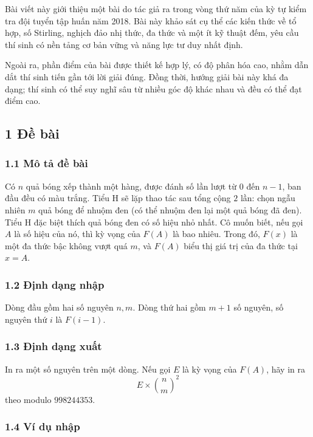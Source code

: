 \documentclass[11pt]{article}
\begin{document}
Bài viết này giới thiệu một bài do tác giả ra trong vòng thứ năm của kỳ tự kiểm
tra đội tuyển tập huấn năm 2018. Bài này khảo sát cụ thể các kiến thức về tổ
hợp, số Stirling, nghịch đảo nhị thức, đa thức và một ít kỹ thuật đếm, yêu cầu
thí sinh có nền tảng cơ bản vững và năng lực tư duy nhất định.

Ngoài ra, phần điểm của bài được thiết kế hợp lý, có độ phân hóa cao, nhằm dẫn
dắt thí sinh tiến gần tới lời giải đúng. Đồng thời, hướng giải bài này khá đa
dạng; thí sinh có thể suy nghĩ sâu từ nhiều góc độ khác nhau và đều có thể đạt
điểm cao.

\subsection*{1 Đề bài}

\subsubsection*{1.1 Mô tả đề bài}

Có \(n\) quả bóng xếp thành một hàng, được đánh số lần lượt từ \(0\) đến
\(n-1\), ban đầu đều có màu trắng. Tiểu H sẽ lặp thao tác sau tổng cộng
\(2\) lần: chọn ngẫu nhiên \(m\) quả bóng để nhuộm đen (có thể nhuộm đen lại
một quả bóng đã đen). Tiểu H đặc biệt thích quả bóng đen có số hiệu nhỏ nhất.
Cô muốn biết, nếu gọi \(A\) là số hiệu của nó, thì kỳ vọng của \(F(A)\) là bao
nhiêu. Trong đó, \(F(x)\) là một đa thức bậc không vượt quá \(m\), và \(F(A)\)
biểu thị giá trị của đa thức tại \(x=A\).

\subsubsection*{1.2 Định dạng nhập}

Dòng đầu gồm hai số nguyên \(n,m\). Dòng thứ hai gồm \(m+1\) số nguyên, số
nguyên thứ \(i\) là \(F(i-1)\).

\subsubsection*{1.3 Định dạng xuất}

In ra một số nguyên trên một dòng. Nếu gọi \(E\) là kỳ vọng của \(F(A)\), hãy
in ra
\[
  E\times \binom{n}{m}^{2}
\]
theo modulo \(998244353\).

\subsubsection*{1.4 Ví dụ nhập}
\end{document}
